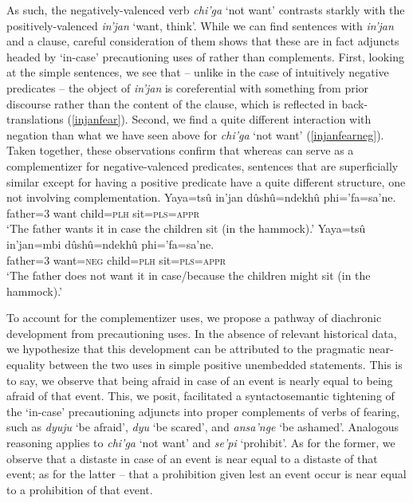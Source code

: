 \documentclass[output=paper,colorlinks,citecolor=brown]{langscibook}
\begin{document}
As such, the negatively-valenced verb \emph{chi'ga} `not want' contrasts starkly with the positively-valenced \emph{in'jan} `want, think'. While we can find sentences with \emph{in'jan} and a  clause, careful consideration of them shows that these are in fact adjuncts headed by `in-case' precautioning uses of  rather than complements. First, looking at the simple sentences, we see that -- unlike in the case of intuitively negative predicates -- the object of \emph{in'jan} is coreferential with something from prior discourse rather than the content of the  clause, which is reflected in back-translations (\ref{injanfear}). Second, we find a quite different interaction with negation than what we have seen above for \emph{chi'ga} `not want' (\ref{injanfearneg}). Taken together, these observations confirm that whereas  can serve as a complementizer for negative-valenced predicates, sentences that are superficially similar except for having a positive predicate have a quite different structure, one not involving complementation.
    \ea \label{injanfear}
    \gll Yaya=tsû in'jan {\ob}dûshû=ndekhû phi='fa=sa'ne.{\cb} \\
         father\textsc{=}3 want child=\textsc{plh} sit=\textsc{pls=appr}   \\
    \glt `The father wants it in case the children sit (in the hammock).'
    \ex \label{injanfearneg} %
    \gll Yaya=tsû in'jan=mbi {\ob}dûshû=ndekhû phi='fa=sa'ne.{\cb} \\
         father\textsc{=}3 want=\textsc{neg} child=\textsc{plh} sit=\textsc{pls=appr} \\
    \glt `The father does not want it in case/because the children might sit (in the hammock).'
\z

To account for the complementizer uses, we propose a pathway of diachronic development from precautioning uses. In the absence of relevant historical data, we hypothesize that this development can be attributed to the pragmatic near-equality between the two uses in simple positive unembedded statements. This is to say, we observe that being afraid in case of an event is nearly equal to being afraid of that event. This, we posit, facilitated a syntactosemantic tightening of the `in-case' precautioning adjuncts into proper complements of verbs of fearing, such as \emph{dyuju} `be afraid', \emph{dyu} `be scared', and \emph{ansa'nge} `be ashamed'. Analogous reasoning applies to \emph{chi'ga} `not want' and \emph{se'pi} `prohibit'. As for the former, we observe that a distaste in case of an event is near equal to a distaste of that event; as for the latter -- that a prohibition given lest an event occur is near equal to a prohibition of that event.
\end{document}
